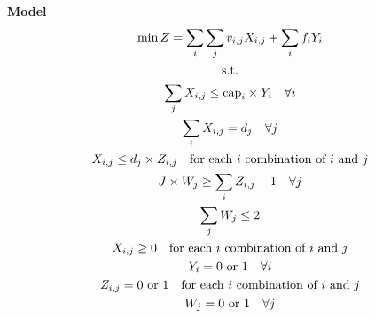 \documentclass[10pt]{article}
\begin{document}
\textbf{Model}
\begin{gather}
    \min Z = \sum_i\sum_j v_{i, j}X_{i, j} + \sum_i f_iY_i\notag\\
    \text{s.t.}\notag\\
    \sum_j X_{i, j} \le \text{cap}_i \times Y_i\quad\forall i\\
    \sum_i X_{i, j} = d_j\quad\forall j\\ 
    X_{i, j} \le d_j\times Z_{i, j} \quad\text{for each $i $ combination of $i $ and $j $}\\
    J\times W_j \ge \sum_i Z_{i, j} - 1 \quad\forall j\\ 
    \sum_j W_j \le 2\\
    X_{i, j} \ge 0 \quad\text{for each $i $ combination of $i $ and $j $}\\
    Y_i = 0 \text{ or } 1 \quad\forall i\\
    Z_{i, j} = 0 \text{ or } 1 \quad\text{for each $i $ combination of $i $ and $j $}\\
    W_j = 0 \text{ or } 1 \quad\forall j
\end{gather}
\end{document}
